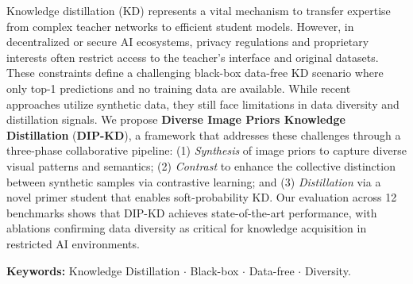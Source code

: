 Knowledge distillation (KD) represents a vital mechanism to transfer expertise from complex teacher networks to efficient student models.
However, in decentralized or secure AI ecosystems, privacy regulations and proprietary interests often restrict access to the teacher's interface and original datasets.
These constraints define a challenging black-box data-free KD scenario where only top-1 predictions and no training data are available.
While recent approaches utilize synthetic data, they still face limitations in data diversity and distillation signals.
We propose \textbf{Diverse Image Priors Knowledge Distillation} (\textbf{DIP-KD}), a framework that addresses these challenges through a three-phase collaborative pipeline: (1) \textit{Synthesis} of image priors to capture diverse visual patterns and semantics; (2) \textit{Contrast} to enhance the collective distinction between synthetic samples via contrastive learning; and (3) \textit{Distillation} via a novel primer student that enables soft-probability KD.
Our evaluation across 12 benchmarks shows that DIP-KD achieves state-of-the-art performance, with ablations confirming data diversity as critical for knowledge acquisition in restricted AI environments.

\textbf{Keywords:} Knowledge Distillation $\cdot$ Black-box $\cdot$ Data-free $\cdot$ Diversity.
